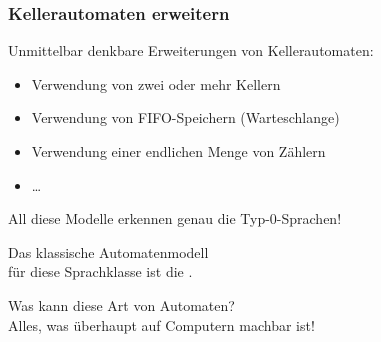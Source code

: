 \documentclass[onlymath]{beamer}
\begin{document}
\begin{frame}\frametitle{Kellerautomaten erweitern}

Unmittelbar denkbare Erweiterungen von Kellerautomaten:
\begin{itemize}
\item Verwendung von zwei oder mehr Kellern
\item Verwendung von FIFO-Speichern (Warteschlange)
\item Verwendung einer endlichen Menge von Zählern
\item \ldots
\end{itemize}
\alert{All diese Modelle erkennen genau die Typ-0-Sprachen!}
\medskip\pause

Das klassische Automatenmodell\\für diese Sprachklasse ist die .%
%
\medskip\pause

Was kann diese Art von Automaten?\pause\\
Alles, was überhaupt auf Computern machbar ist!\medskip


\end{frame}
\end{document}
